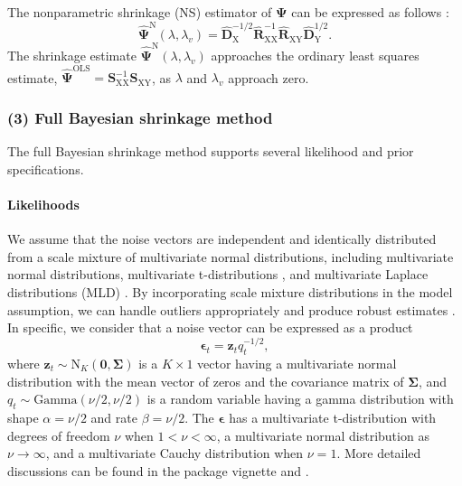 The nonparametric shrinkage (NS) estimator of \(\boldsymbol\Psi\) can be expressed as follows \citep{Schafer05b, Rhein07c}:
\begin{equation}
    \widehat{ \boldsymbol\Psi }^\text{N} (\lambda, \lambda_v) =
    \widehat{\mathbf{D}}_\text{X}^{-1/2}
    \widehat{\mathbf{R}}_\text{XX}^{-1}
    \widehat{\mathbf{R}}_\text{XY}
    \widehat{\mathbf{D}}_\text{Y}^{1/2}.
\end{equation}
The shrinkage estimate \(\widehat{ \boldsymbol\Psi }^\text{N} (\lambda, \lambda_v)\) approaches the ordinary least squares estimate, \(\widehat{\boldsymbol\Psi}^{\text{OLS}} = \mathbf{S}_\text{XX}^{-1} \mathbf{S}_\text{XY}\), as \(\lambda\) and \(\lambda_v\) approach zero.

\subsubsection{(3) Full Bayesian shrinkage method}\label{full-bayesian-shrinkage-method}

The full Bayesian shrinkage method supports several likelihood and prior
specifications.

\paragraph{Likelihoods}\label{likelihoods}

We assume that the noise vectors are independent and identically distributed from a scale mixture of
multivariate normal distributions, including multivariate normal
distributions, multivariate t-distributions \citep{Ni05}, and
multivariate Laplace distributions (MLD) \citep{Eltoft06}. By
incorporating scale mixture distributions in the model assumption, we
can handle outliers appropriately and produce robust estimates
\citep{West84}. In specific, we consider that a noise vector can be
expressed as a product
\begin{equation}
    \boldsymbol\epsilon_t = \mathbf{z}_t q_t^{-1/2},
    \label{eq:productZD}
    \end{equation} where
\(\mathbf{z}_t \sim \text{N}_K(\mathbf{0}, \mathbf{\Sigma})\) is a
\(K\times 1\) vector having a multivariate normal distribution with the
mean vector of zeros and the covariance matrix of \(\boldsymbol\Sigma\),
and \(q_t \sim \text{Gamma}(\nu/2, \nu/2)\) is a random variable having
a gamma distribution with shape \(\alpha = \nu/2\) and rate
\(\beta = \nu/2\).
The \(\boldsymbol\epsilon\) has a multivariate t-distribution with degrees of freedom \(\nu\) when \(1<\nu<\infty\), a multivariate normal
distribution as \(\nu \rightarrow \infty\), and
a multivariate Cauchy distribution when \(\nu = 1\).
More detailed discussions can be found in the package vignette and \citet{LeeChoiKim2016}.

